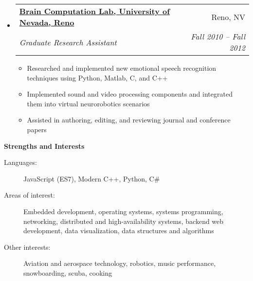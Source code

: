 \documentclass[letterpaper,11pt]{article}
\makeatletter
\newcommand{\resitem}[1]{\item #1 \vspace{-2pt}}
\newcommand{\resheading}[1]{{\normalsize \colorbox{mygrey}{\begin{minipage}{\textwidth}{\textbf{#1 \vphantom{p\^{E}}}}\end{minipage}}}}
\newcommand{\ressubheading}[4]{
\begin{tabular*}{6.5in}{l@{\extracolsep{\fill}}r}
		\textbf{#1} & #2 \\
		\textit{#3} & \textit{#4} \\
\end{tabular*}\vspace{-6pt}}
\makeatother
\begin{document}
\begin{itemize}
		\item
			\ressubheading{\href{http://www.cse.unr.edu/brain/}{Brain Computation Lab, University of Nevada, Reno}}{Reno, NV}{Graduate Research Assistant}{Fall 2010 -- Fall 2012}
				{ \footnotesize
				\begin{itemize}
					\resitem{Researched and implemented new emotional speech recognition techniques using Python, Matlab, C, and C++}
					\resitem{Implemented sound and video processing components and integrated them into virtual neurorobotics scenarios}
					\resitem{Assisted in authoring, editing, and reviewing journal and conference papers}
				\end{itemize}
				}
	\end{itemize}  %

\resheading{Strengths and Interests}
	\linebreak
	\begin{description}
		\item[Languages:] { \footnotesize JavaScript (ES7), Modern C++, Python, C\# }
		\item[Areas of interest:] { \footnotesize Embedded development, operating systems, systems programming, networking, distributed and high-availability systems, backend web development, data visualization, data structures and algorithms}
		\item[Other interests:] { \footnotesize Aviation and aerospace technology, robotics, music performance, snowboarding, scuba, cooking }
	\end{description} %

\end{document}
